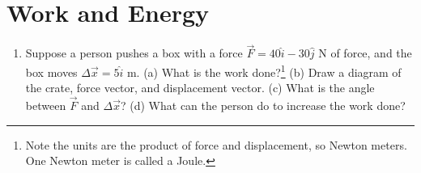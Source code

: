 \documentclass{article}
\begin{document}
\section{Work and Energy}

\begin{enumerate}
\item Suppose a person pushes a box with a force $\vec{F} = 40 \hat{i} - 30 \hat{j}$ N of force, and the box moves $\Delta \vec{x} = 5\hat{i}$ m.  (a) What is the work done?\footnote{Note the units are the product of force and displacement, so Newton meters.  One Newton meter is called a Joule.} (b) Draw a diagram of the crate, force vector, and displacement vector. (c) What is the angle between $\vec{F}$ and $\Delta \vec{x}$? (d) What can the person do to increase the work done?
\end{enumerate}
\end{document}
